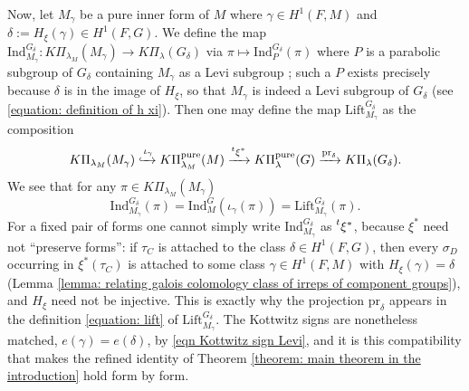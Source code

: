 \documentclass[11pt,letterpaper]{amsart}
\newcommand{\pure}{\mathrm{pure}}
\newcommand{\pr}{\mathrm{pr}}
\newcommand{\Ind}{\mathrm{Ind}}
\newcommand{\Lift}{\mathrm{Lift}}
\newcommand{\stsh}[2]{{#1}_{#2}}
\renewcommand{\1}{\mathbbm{1}}
\numberwithin{equation}{section}
\begin{document}
Now, let $M_\gamma$ be a pure inner form of $M$ where $\gamma\in H^1(F,M)$ and  {$\delta:=H_\xi(\gamma)\in H^1(F,G)$}. We define the map
 {$\Ind_{M_\gamma}^{G_\delta}:K\Pi_{\lambda_M}(M_\gamma)\to K\Pi_\lambda(G_\delta)$} via $\pi \mapsto \Ind_{P}^{G_\delta}(\pi)$ where $P$ is a parabolic subgroup of $G_\delta$ containing $M_\gamma$ as a Levi subgroup {; such a $P$ exists precisely because $\delta$ is in the image of $H_\xi$, so that $M_\gamma$ is indeed a Levi subgroup of $G_\delta$ (see \eqref{equation: definition of h xi})}. %
Then one may define the map $\Lift_{M_\gamma}^{G_\delta}$ as the composition 
\[K\Pi_{\lambda_M}(M_\gamma) \xhookrightarrow{\iota_\gamma} K\Pi_{\lambda_M}^\pure(M) \xrightarrow[]{\prescript{t}{}{\xi^*}} K\Pi_{\lambda}^\pure(G)\xrightarrow[]{\pr_{\delta}} K\Pi_{\lambda}(G_\delta).\]
We see that for any $\pi \in K\Pi_{\lambda_M}(M_\gamma)$
\[\Ind_{M_\gamma}^{G_\delta}(\pi)=\Ind_M^G(\iota_\gamma(\pi))=\Lift_{M_\gamma}^{G_\delta}(\pi).\]
 {For a fixed pair of forms one cannot simply write $\Ind_{M_\gamma}^{G_\delta}$ as $\prescript{t}{}{\xi^*}$, because $\xi^*$ need not ``preserve forms'': if $\stsh{\tau}{C}$ is attached to the class $\delta \in H^1(F,G)$, then every $\stsh{\sigma}{D}$ occurring in $\xi^*(\stsh{\tau}{C})$ is attached to {some} class $\gamma \in H^1(F,M)$ with $H_\xi(\gamma)=\delta$ (Lemma \ref{lemma: relating galois colomology class of irreps of component groups}), and $H_\xi$ need not be injective. This is exactly why the projection $\pr_\delta$ appears in the definition \eqref{equation: lift} of $\Lift_{M_\gamma}^{G_\delta}$. The Kottwitz signs are nonetheless matched, $e(\gamma)=e(\delta)$, by  \eqref{eqn Kottwitz sign Levi}, and it is this compatibility that makes the refined identity of Theorem \ref{theorem: main theorem in the introduction} hold form by form.}
\end{document}
